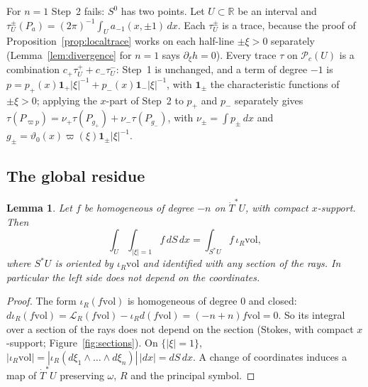 \documentclass[11pt,oneside,reqno]{article}
\newcommand{\R}{\mathbb R}
\newcommand{\cP}{\mathcal P}
\newcommand{\Tdot}{\dot T^*}
\newcommand{\Lie}{\mathcal L}
\newcommand{\vol}{\mathrm{vol}}
\newcommand{\pa}{\partial}
\theoremstyle{plain}
\newtheorem{lemma}[theorem]{Lemma}
\theoremstyle{definition}
\theoremstyle{remark}
\begin{document}
For \(n=1\) Step~2 fails: \(S^0\) has two points. Let \(U\subset\R\) be an interval and
\(\tau^\pm_U(P_a)=(2\pi)^{-1}\int_Ua_{-1}(x,\pm1)\,dx\). Each \(\tau^\pm_U\) is a trace, because the proof
of Proposition~\ref{prop:localtrace} works on each half-line \(\pm\xi>0\) separately
(Lemma~\ref{lem:divergence} for \(n=1\) says \(\pa_\xi h=0\)). Every trace \(\tau\) on \(\cP_c(U)\) is a
combination \(c_+\tau^+_U+c_-\tau^-_U\): Step~1 is unchanged, and a term of degree \(-1\) is
\(p=p_+(x)\mathbf 1_+|\xi|^{-1}+p_-(x)\mathbf 1_-|\xi|^{-1}\), with \(\mathbf 1_\pm\) the characteristic functions of \(\pm\xi>0\);
applying the \(x\)-part of Step~2 to \(p_+\) and \(p_-\) separately gives
\(\tau(P_{\varpi p})=\nu_+\tau(P_{g_+})+\nu_-\tau(P_{g_-})\), with \(\nu_\pm=\int p_\pm\,dx\) and
\(g_\pm=\vartheta_0(x)\varpi(\xi)\mathbf 1_\pm|\xi|^{-1}\).

\subsection{The global residue}\label{subsec:globalres}

\begin{lemma}\label{lem:Sintegral}
Let \(f\) be homogeneous of degree \(-n\) on \(\Tdot U\), with compact \(x\)-support. Then
\[
 \int_U\int_{|\xi|=1}f\,dS\,dx=\int_{S^*U}f\,\iota_R\vol ,
\]
where \(S^*U\) is oriented by \(\iota_R\vol\)
and identified with any section of the rays. In particular the left side does not
depend on the coordinates.
\end{lemma}

\begin{proof}
The form \(\iota_R(f\vol)\) is homogeneous of degree \(0\) and closed:
\(d\iota_R(f\vol)=\Lie_R(f\vol)-\iota_Rd(f\vol)=(-n+n)f\vol=0\). So its integral over a section of
the rays does not depend on the section (Stokes, with compact \(x\)-support; Figure~\ref{fig:sections}). On
\(\{|\xi|=1\}\), \(|\iota_R\vol|=|\iota_R(d\xi_1\wedge\dots\wedge d\xi_n)|\,|dx|=dS\,dx\). A change of coordinates
induces a map of \(\Tdot U\) preserving \(\omega\), \(R\) and the principal symbol.
\end{proof}
\end{document}
